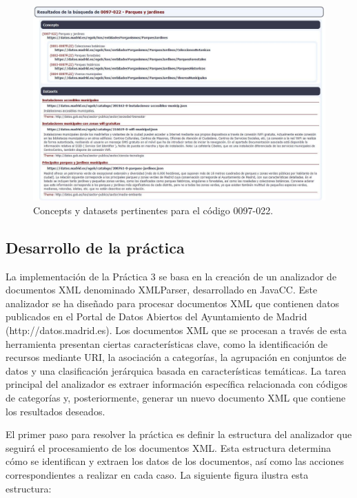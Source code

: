 \begin{figure}[H]
    \centering
    \includegraphics[width=\textwidth]{imagenes/Practica3fig2.jpg}
    \caption{Concepts y datasets pertinentes para el código 0097-022.}
    \label{fig:Practica3fig2.jpg}
\end{figure}

\subsection{Desarrollo de la práctica}

\noindent La implementación de la Práctica 3 se basa en la creación de un analizador de documentos XML denominado XMLParser, desarrollado en JavaCC. Este analizador se ha diseñado para procesar documentos XML que contienen datos publicados en el Portal de Datos Abiertos del Ayuntamiento de Madrid (http://datos.madrid.es).
Los documentos XML que se procesan a través de esta herramienta presentan ciertas características clave, como la identificación de recursos mediante URI, la asociación a categorías, la agrupación en conjuntos de datos y una clasificación jerárquica basada en características temáticas. La tarea principal del analizador es extraer información específica relacionada con códigos de categorías y, posteriormente, generar un nuevo documento XML que contiene los resultados deseados.

El primer paso para resolver la práctica es definir la estructura del analizador que seguirá el procesamiento de los documentos XML. Esta estructura determina cómo se identifican y extraen los datos de los documentos, así como las acciones correspondientes a realizar en cada caso. La siguiente figura ilustra esta estructura:

